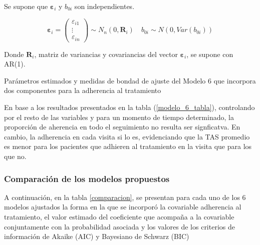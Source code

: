 \documentclass[spanish]{article}
\numberwithin{figure}{subsection}
\numberwithin{equation}{subsection}
\numberwithin{table}{subsection}
\begin{document}
Se supone que $\bm{\varepsilon}_i$ y $b_{0i}$ son independientes.

\[ 
	\bm{\varepsilon}_i = \begin{pmatrix} \varepsilon_{i1} \\ \vdots \\ \varepsilon_{in} \end{pmatrix} \sim N_{n}(0, \bm{R}_i)
	\quad
	b_{0i} \sim N(0, Var(b_{0i}))
\]

Donde $\bm{R}_i$, matriz de variancias y covariancias del vector
$\bm{\varepsilon}_{i}$, se supone con AR(1).

\begin{table}[H]
	\centering
	\caption{Parámetros estimados y medidas de bondad de ajuste del Modelo 6 que incorpora dos componentes para la adherencia al tratamiento}
	\label{modelo_6_tabla}
	
\end{table}

En base a los resultados presentados en la tabla (\ref{modelo_6_tabla}),
controlando por el resto de las variables y para un momento de tiempo
determinado, la proporción de aherencia en todo el seguimiento no resulta ser
signficatva. En cambio, la adherencia en cada visita si lo es, evidenciando que
la TAS promedio es menor para los pacientes que adhieren al tratamiento en la
visita que para los que no.

\subsubsection{Comparación de los modelos propuestos}

A continuación, en la tabla \ref{comparacion}, se presentan para cada uno de los
6 modelos ajustados la forma en la que se incorporó la covariable adherencia al
tratamiento, el valor estimado del coeficiente que acompaña a la covariable
conjuntamente con la probabilidad asociada y los valores de los criterios de
información de Akaike (AIC) y Bayesiano de Schwarz (BIC)
\end{document}
